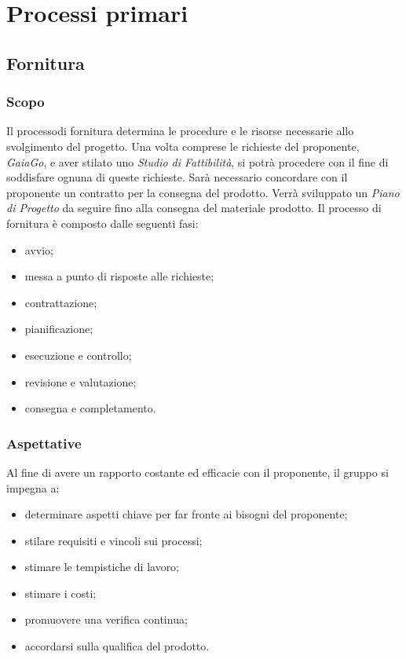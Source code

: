 \section{Processi primari}
\subsection{Fornitura}
\subsubsection{Scopo}
Il processo\glosp di fornitura determina le procedure e le risorse necessarie allo svolgimento del progetto. Una volta comprese le richieste del proponente, \textit{GaiaGo}, e aver stilato uno \textit{Studio di Fattibilità}, si potrà procedere con il fine di soddisfare ognuna di queste richieste. Sarà necessario concordare con il proponente un contratto per la consegna del prodotto. Verrà sviluppato un \textit{Piano di Progetto} da seguire fino alla consegna del materiale prodotto.
	Il processo di fornitura è composto dalle seguenti fasi:
	\begin{itemize}
		\item avvio;
		\item messa a punto di risposte alle richieste;
		\item contrattazione;
		\item pianificazione;
		\item esecuzione e controllo;
		\item revisione e valutazione;
		\item consegna e completamento.
	\end{itemize}
	\subsubsection{Aspettative}
	Al fine di avere un rapporto costante ed efficacie con il proponente, il gruppo si impegna a:
	\begin{itemize}
		\item determinare aspetti chiave per far fronte ai bisogni del proponente;
		\item stilare requisiti e vincoli sui processi;
		\item stimare le tempistiche di lavoro;
		\item stimare i costi;
		\item promuovere una verifica continua;		
		\item accordarsi sulla qualifica del prodotto.
	\end{itemize}
